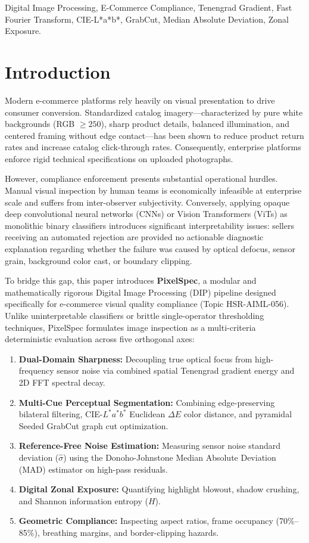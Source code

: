 \documentclass[conference]{IEEEtran}
\begin{document}
\begin{IEEEkeywords}
Digital Image Processing, E-Commerce Compliance, Tenengrad Gradient, Fast Fourier Transform, CIE-L*a*b*, GrabCut, Median Absolute Deviation, Zonal Exposure.
\end{IEEEkeywords}

\section{Introduction}
Modern e-commerce platforms rely heavily on visual presentation to drive consumer conversion. Standardized catalog imagery—characterized by pure white backgrounds (RGB $\ge 250$), sharp product details, balanced illumination, and centered framing without edge contact—has been shown to reduce product return rates and increase catalog click-through rates. Consequently, enterprise platforms enforce rigid technical specifications on uploaded photographs.

However, compliance enforcement presents substantial operational hurdles. Manual visual inspection by human teams is economically infeasible at enterprise scale and suffers from inter-observer subjectivity. Conversely, applying opaque deep convolutional neural networks (CNNs) or Vision Transformers (ViTs) as monolithic binary classifiers introduces significant interpretability issues: sellers receiving an automated rejection are provided no actionable diagnostic explanation regarding whether the failure was caused by optical defocus, sensor grain, background color cast, or boundary clipping.

To bridge this gap, this paper introduces \textbf{PixelSpec}, a modular and mathematically rigorous Digital Image Processing (DIP) pipeline designed specifically for e-commerce visual quality compliance (Topic HSR-AIML-056). Unlike uninterpretable classifiers or brittle single-operator thresholding techniques, PixelSpec formulates image inspection as a multi-criteria deterministic evaluation across five orthogonal axes:
\begin{enumerate}
    \item \textbf{Dual-Domain Sharpness:} Decoupling true optical focus from high-frequency sensor noise via combined spatial Tenengrad gradient energy and 2D FFT spectral decay.
    \item \textbf{Multi-Cue Perceptual Segmentation:} Combining edge-preserving bilateral filtering, CIE-$L^*a^*b^*$ Euclidean $\Delta E$ color distance, and pyramidal Seeded GrabCut graph cut optimization.
    \item \textbf{Reference-Free Noise Estimation:} Measuring sensor noise standard deviation ($\hat{\sigma}$) using the Donoho-Johnstone Median Absolute Deviation (MAD) estimator on high-pass residuals.
    \item \textbf{Digital Zonal Exposure:} Quantifying highlight blowout, shadow crushing, and Shannon information entropy ($H$).
    \item \textbf{Geometric Compliance:} Inspecting aspect ratios, frame occupancy (70\%--85\%), breathing margins, and border-clipping hazards.
\end{enumerate}
\end{document}
